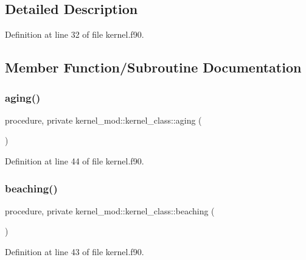 \subsection{Detailed Description}


Definition at line 32 of file kernel.\+f90.



\subsection{Member Function/\+Subroutine Documentation}
\mbox{\label{structkernel__mod_1_1kernel__class_a7366a75fd76c37804607b466cf4f0212}} 
\subsubsection{\texorpdfstring{aging()}{aging()}}
{\footnotesize\ttfamily procedure, private kernel\+\_\+mod\+::kernel\+\_\+class\+::aging (\begin{DoxyParamCaption}{ }\end{DoxyParamCaption})\hspace{0.3cm}{\ttfamily [private]}}



Definition at line 44 of file kernel.\+f90.

\mbox{\label{structkernel__mod_1_1kernel__class_a8fb79882cea4947812f75cb3e39c9617}} 
\subsubsection{\texorpdfstring{beaching()}{beaching()}}
{\footnotesize\ttfamily procedure, private kernel\+\_\+mod\+::kernel\+\_\+class\+::beaching (\begin{DoxyParamCaption}{ }\end{DoxyParamCaption})\hspace{0.3cm}{\ttfamily [private]}}



Definition at line 43 of file kernel.\+f90.

